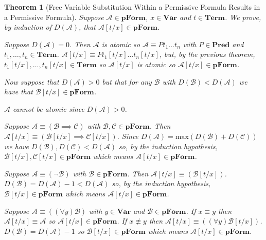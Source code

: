 \documentclass[12pt]{article}
\theoremstyle{break}
\theoremstyle{break}
\newtheorem{theorem}{Theorem}[section]
\theoremstyle{break}
\theoremstyle{break}
\theoremstyle{break}
\newtheorem{informal definition}[definition]{Informal Definition}
\newcommand{\mc}[1]{\mathcal{#1}}
\begin{document}
\begin{theorem}[Free Variable Substitution Within a Permissive Formula Results in a Permissive Formula]
Suppose $\mc{A}\in\textbf{pForm}$, $x\in\textbf{Var}$ and $t \in \textbf{Term}$.
We prove, by induction of $D(\mc{A})$, that $\mc{A}[t/x] \in \textbf{pForm}$.

Suppose $D(\mc{A}) = 0$.
Then $\mc{A}$ is atomic so $\mc{A}\equiv Pt_1\ldots t_n$ with $P\in\textbf{Pred}$ and $t_1,\ldots, t_n\in\textbf{Term}$. $\mc{A}[t/x] \equiv Pt_1[t/x]\ldots t_n[t/x]$, but, by the previous theorem, $t_1[t/x],\ldots,t_n[t/x]\in\textbf{Term}$ so $\mc{A}[t/x]$ is atomic so $\mc{A}[t/x]\in\textbf{pForm}$.

Now suppose that $D(\mc{A}) > 0$ but that for any $\mc{B}$ with $D(\mc{B}) < D(\mc{A})$ we have that $\mc{B}[t/x] \in \textbf{pForm}$.

$\mc{A}$ cannot be atomic since $D(\mc{A})>0$.

Suppose $\mc{A} \equiv (\mc{B}\implies \mc{C})$ with $\mc{B}, \mc{C}\in\textbf{pForm}$.
Then $\mc{A}[t/x] \equiv (\mc{B}[t/x] \implies \mc{C}[t/x])$.
Since $D(\mc{A}) = \text{max}(D(\mc{B}) + D(\mc{C}))$ we have $D(\mc{B}), D(\mc{C}) < D(\mc{A})$ so, by the induction hypothesis, $\mc{B}[t/x], \mc{C}[t/x]\in\textbf{pForm}$ which means $\mc{A}[t/x]\in\textbf{pForm}$.

Suppose $\mc{A} \equiv (\lnot \mc{B})$ with $\mc{B}\in\textbf{pForm}$.
Then $\mc{A}[t/x] \equiv (\mc{B}[t/x])$.
$D(\mc{B}) = D(\mc{A}) -1 < D(\mc{A})$ so, by the induction hypothesis, $\mc{B}[t/x]\in\textbf{pForm}$ which means $\mc{A}[t/x]\in\textbf{pForm}$.

Suppose $\mc{A} \equiv ((\forall y) \mc{B})$ with $y\in\textbf{Var}$ and $\mc{B}\in\textbf{pForm}$.
If $x\equiv y$ then $\mc{A}[t/x] \equiv \mc{A}$ so $\mc{A}[t/x]\in\textbf{pForm}$.
If $x\not\equiv y$ then $\mc{A}[t/x] \equiv ((\forall y) \mc{B}[t/x])$.
$D(\mc{B}) = D(\mc{A})-1$ so $\mc{B}[t/x]\in\textbf{pForm}$ which means $\mc{A}[t/x]\in\textbf{pForm}$.

\end{theorem}
\end{document}
